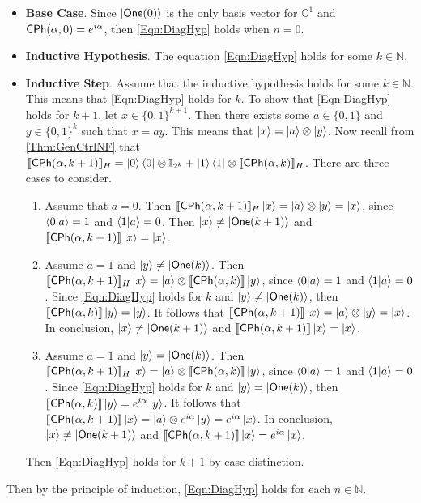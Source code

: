 \begin{itemize}
\item \textbf{Base Case}.
      Since $\ket{\mathsf{One}( 0 )}$ is the only basis vector for $\mathbb{C}^1$ and $\mathsf{CPh}( \alpha, 0 ) = e^{i\alpha}$, then \cref{Eqn:DiagHyp} holds when $n = 0$.
\item \textbf{Inductive Hypothesis}.
      The equation \cref{Eqn:DiagHyp} holds for some $k \in \mathbb{N}$.
\item \textbf{Inductive Step}.
      Assume that the inductive hypothesis holds for some $k \in \mathbb{N}$.
      This means that \cref{Eqn:DiagHyp} holds for $k$.
      To show that \cref{Eqn:DiagHyp} holds for $k + 1$, let $x \in \{ 0, 1 \}^{k+1}$.
      Then there exists some $a \in \{ 0, 1 \}$ and $y \in \{ 0, 1 \}^k$ such that $x = ay$.
      This means that $\ket{x} = \ket{a} \otimes \ket{y}$.
      Now recall from \cref{Thm:GenCtrlNF} that $\llbracket\mathsf{CPh}( \alpha, k + 1 )\rrbracket_H = \ket{0}\bra{0} \otimes \mathbb{I}_{2^k} + \ket{1}\bra{1} \otimes \llbracket\mathsf{CPh}( \alpha, k )\rrbracket_H$.
      There are three cases to consider.
      \begin{enumerate}
      \item Assume that $a = 0$.
            Then $\llbracket\mathsf{CPh}( \alpha, k + 1 )\rrbracket_H \ket{x} = \ket{a} \otimes \ket{y} = \ket{x}$, since $\braket{0|a} = 1$ and $\braket{1|a} = 0$.
            Then $\ket{x} \ne \ket{\mathsf{One}( k + 1 )}$ and $\llbracket\mathsf{CPh}( \alpha, k + 1 )\rrbracket \ket{x} = \ket{x}$.
      \item Assume $a = 1$ and $\ket{y} \ne \ket{\mathsf{One}( k )}$.
            Then $\llbracket\mathsf{CPh}( \alpha, k + 1 )\rrbracket_H \ket{x} = \ket{a} \otimes \llbracket\mathsf{CPh}( \alpha, k )\rrbracket \ket{y}$, since $\braket{0|a} = 1$ and $\braket{1|a} = 0$.
            Since \cref{Eqn:DiagHyp} holds for $k$ and $\ket{y} \ne \ket{\mathsf{One}( k )}$, then $\llbracket\mathsf{CPh}( \alpha, k )\rrbracket \ket{y} = \ket{y}$.
            It follows that $\llbracket\mathsf{CPh}( \alpha, k + 1 )\rrbracket \ket{x} = \ket{a} \otimes \ket{y} = \ket{x}$.
            In conclusion, $\ket{x} \ne \ket{\mathsf{One}( k + 1 )}$ and $\llbracket\mathsf{CPh}( \alpha, k + 1 )\rrbracket \ket{x} = \ket{x}$.
      \item Assume $a = 1$ and $\ket{y} = \ket{\mathsf{One}( k )}$.
            Then $\llbracket\mathsf{CPh}( \alpha, k + 1 )\rrbracket_H \ket{x} = \ket{a} \otimes \llbracket\mathsf{CPh}( \alpha, k )\rrbracket \ket{y}$, since $\braket{0|a} = 1$ and $\braket{1|a} = 0$.
            Since \cref{Eqn:DiagHyp} holds for $k$ and $\ket{y} = \ket{\mathsf{One}( k )}$, then $\llbracket\mathsf{CPh}( \alpha, k )\rrbracket \ket{y} = e^{i\alpha} \ket{y}$.
            It follows that $\llbracket\mathsf{CPh}( \alpha, k + 1 )\rrbracket \ket{x} = \ket{a} \otimes e^{i\alpha} \ket{y} = e^{i\alpha} \ket{x}$.
            In conclusion, $\ket{x} \ne \ket{\mathsf{One}( k + 1 )}$ and $\llbracket\mathsf{CPh}( \alpha, k + 1 )\rrbracket \ket{x} = e^{i\alpha} \ket{x}$.
      \end{enumerate}
      Then \cref{Eqn:DiagHyp} holds for $k + 1$ by case distinction.
\end{itemize}
Then by the principle of induction, \cref{Eqn:DiagHyp} holds for each $n \in \mathbb{N}$.

